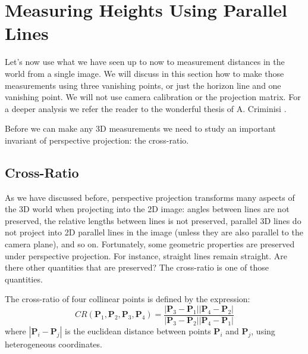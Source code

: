 \section{Measuring Heights Using Parallel Lines}


Let's now use what we have seen up to now to measurement distances in the world from a single image. We will discuss in this section how to make those measurements using three vanishing points, or just the horizon line and one vanishing point. We will not use camera calibration or the projection matrix. For a deeper analysis we refer the reader to the wonderful thesis of A. Criminisi \cite{criminisi1999accurate}.






Before we can make any 3D measurements we need to study an important invariant of perspective projection: the cross-ratio.

\subsection{Cross-Ratio}

As we have discussed before, perspective projection transforms many aspects of the 3D world when projecting into the 2D image: angles between lines are not preserved, the relative lengths between lines is not preserved, parallel 3D lines do not project into 2D parallel lines in the image (unless they are also parallel to the camera plane), and so on. Fortunately, some geometric properties are preserved under perspective projection. For instance, straight lines remain straight. Are there other quantities that are preserved? The cross-ratio is one of those quantities. 


The cross-ratio of four collinear points is defined by the expression:
\begin{equation}
CR \left( \mathbf{P}_1,\mathbf{P}_2,\mathbf{P}_3,\mathbf{P}_4 \right) 
= 
\frac{\left| \mathbf{P}_3 -\mathbf{P}_1 \right| \left|\mathbf{P}_4 -\mathbf{P}_2 \right|}
{\left| \mathbf{P}_3 -\mathbf{P}_2 \right| \left|\mathbf{P}_4 -\mathbf{P}_1 \right|}
\end{equation}
where $\left| \mathbf{P}_i -\mathbf{P}_j \right|$ is the euclidean distance between points $\mathbf{P}_i$ and $\mathbf{P}_j$, using heterogeneous coordinates. 

